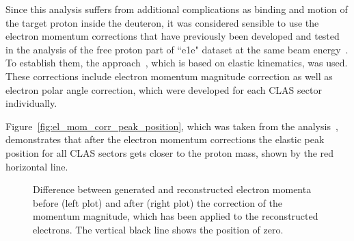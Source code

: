Since this analysis suffers from additional complications as binding and motion of the target proton inside the deuteron, it was considered sensible to use the electron momentum corrections that have previously been developed and tested in the analysis of the free proton part of ``e1e" dataset at the same beam energy~\cite{Fed_an_note:2017}. To establish them, the approach~\cite{KPark:momcorr}, which is based on elastic kinematics, was used. These corrections include electron momentum magnitude correction as well as electron polar angle correction, which were developed for each CLAS sector individually.  


Figure~\ref{fig:el_mom_corr_peak_position}, which was taken from the analysis~\cite{Fed_an_note:2017}, demonstrates that after the electron momentum corrections the elastic peak position for all CLAS sectors gets closer to the proton mass, shown by the red horizontal line.

\begin{figure}[htp]
\begin{center}
\caption{\small Difference between generated and reconstructed electron momenta before (left plot) and after (right plot) the correction of the momentum magnitude, which has been applied to the reconstructed electrons. The vertical black line shows the position of zero. \label{fig:el_mom_corr_sim}} 
\end{center}
\end{figure}


